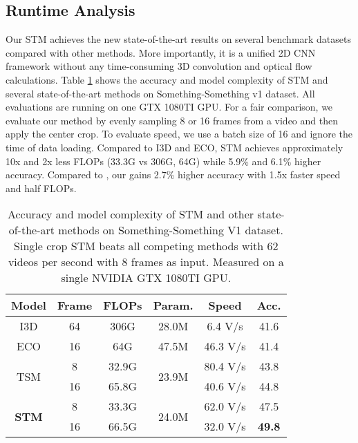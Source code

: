 \documentclass[10pt,twocolumn,letterpaper]{article}
\begin{document}
	\subsection{Runtime Analysis}
	Our STM achieves the new state-of-the-art results on several benchmark datasets compared with other methods. More importantly, it is a unified 2D CNN framework without any time-consuming 3D convolution and optical flow calculations. Table \ref{runtime} shows the accuracy and model complexity of STM and several state-of-the-art methods on Something-Something v1 dataset. All evaluations are running on one GTX 1080TI GPU. For a fair comparison, we evaluate our method by evenly sampling 8 or 16 frames from a video and then apply the center crop. To evaluate speed, we use a batch size of 16 and ignore the time of data loading. Compared to I3D and ECO, STM achieves approximately 10x and 2x less FLOPs (33.3G vs 306G, 64G) while 5.9\% and 6.1\% higher accuracy.
Compared to , our  gains 2.7\% higher accuracy with 1.5x faster speed and half FLOPs.
	
	
	\begin{table}[tbp]
		\centering
		\caption{Accuracy and model complexity of STM and other state-of-the-art methods on Something-Something V1 dataset. Single crop STM beats all competing methods with 62 videos per second with 8 frames as input. Measured on a single NVIDIA GTX 1080TI GPU.}
		\label{runtime}
		\begin{adjustbox}{max width=\textwidth}
			\begin{threeparttable}
				\begin{tabular}{c|c|c|c|c|c}
					\hline
					Model & Frame & FLOPs & Param. & Speed & Acc.\tabularnewline
					\hline
					\hline
					I3D \cite{carreira2017quo} & 64 & 306G & 28.0M & 6.4 V/s & 41.6\tabularnewline
					\hline
					ECO \cite{zolfaghari2018eco} & 16 & 64G & 47.5M & 46.3 V/s & 41.4\tabularnewline
					\hline
					\multirow{2}{*}{TSM \cite{lin2018temporal}} & 8 & 32.9G & \multirow{2}{*}{23.9M} & 80.4 V/s & 43.8\tabularnewline
					\cline{2-3} \cline{3-3} \cline{5-6} \cline{6-6}
					& 16 & 65.8G &  & 40.6 V/s & 44.8\tabularnewline
					\hline
					\multirow{2}{*}{\textbf{STM}} & 8 & 33.3G & \multirow{2}{*}{24.0M} & 62.0 V/s & 47.5\tabularnewline
					\cline{2-3} \cline{3-3} \cline{5-6} \cline{6-6}
					& 16 & 66.5G &  & 32.0 V/s & \textbf{49.8}\tabularnewline
					\hline
				\end{tabular}
			\end{threeparttable}
		\end{adjustbox}
	\end{table}
	
\end{document}
